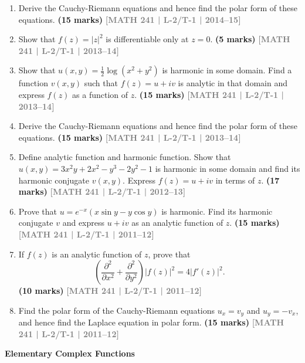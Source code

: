 \documentclass[12pt,a4paper]{article}
\newcommand{\yr}[1]{\hfill\textcolor{gray}{\small\textbf{[#1]}}}
\newcommand{\mk}[1]{\textcolor{orange!70!black}{\small\textbf{(#1 marks)}}}
\newcommand{\subtopic}[2]{%
  \vspace{10pt}
  \noindent\begin{tcolorbox}[colback=#1!8,colframe=#1,boxrule=0.6pt,arc=4pt,
    left=6pt,right=6pt,top=4pt,bottom=4pt]
    \small\bfseries\textcolor{#1}{#2}
  \end{tcolorbox}
  \vspace{2pt}
}
\begin{document}
\begin{enumerate}
\item Derive the Cauchy-Riemann equations and hence find the polar form of these equations.
\mk{15} \yr{MATH 241 | L-2/T-1 | 2014--15}

\item Show that $f(z)=|z|^{2}$ is differentiable only at $z=0$.
\mk{5} \yr{MATH 241 | L-2/T-1 | 2013--14}

\item Show that $u(x,y)=\tfrac{1}{2}\log(x^{2}+y^{2})$ is harmonic in some domain. Find a function $v(x,y)$ such that $f(z)=u+iv$ is analytic in that domain and express $f(z)$ as a function of $z$.
\mk{15} \yr{MATH 241 | L-2/T-1 | 2013--14}

\item Derive the Cauchy-Riemann equations and hence find the polar form of these equations.
\mk{15} \yr{MATH 241 | L-2/T-1 | 2013--14}

\item Define analytic function and harmonic function. Show that $u(x,y)=3x^{2}y+2x^{2}-y^{3}-2y^{2}-1$ is harmonic in some domain and find its harmonic conjugate $v(x,y)$. Express $f(z)=u+iv$ in terms of $z$.
\mk{17} \yr{MATH 241 | L-2/T-1 | 2012--13}

\item Prove that $u = e^{-x}(x\sin y - y\cos y)$ is harmonic. Find its harmonic conjugate $v$ and express $u+iv$ as an analytic function of $z$.
\mk{15} \yr{MATH 241 | L-2/T-1 | 2011--12}

\item If $f(z)$ is an analytic function of $z$, prove that
\[
\left(\frac{\partial^{2}}{\partial x^{2}}+\frac{\partial^{2}}{\partial y^{2}}\right)|f(z)|^{2} = 4|f'(z)|^{2}.
\]
\mk{10} \yr{MATH 241 | L-2/T-1 | 2011--12}

\item Find the polar form of the Cauchy-Riemann equations $u_{x}=v_{y}$ and $u_{y}=-v_{x}$, and hence find the Laplace equation in polar form.
\mk{15} \yr{MATH 241 | L-2/T-1 | 2011--12}

\end{enumerate}

\subtopic{cE}{Elementary Complex Functions}
\label{sub:s5-elementary}
\end{document}
